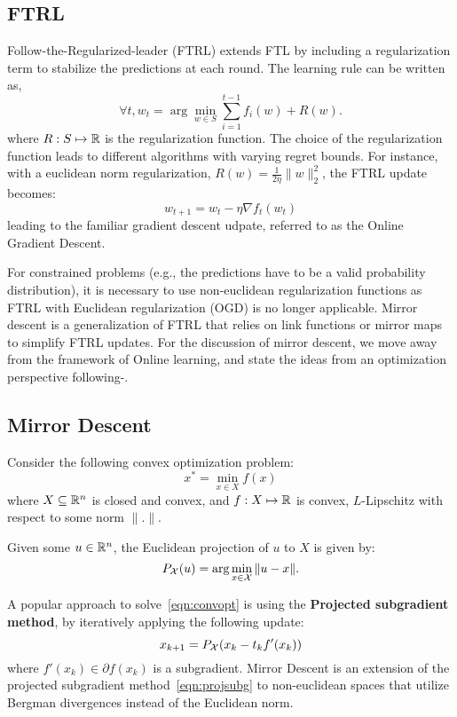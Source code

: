 \subsection{FTRL}\label{sec:ftrl}
Follow-the-Regularized-leader (FTRL) extends FTL by including a regularization term to stabilize
the predictions at each round.
The learning rule can be written as, $$\forall t, w_t = \arg \min_{w \in S} \sum_{i=1}^{t-1} f_i(w)
	+ R(w).
$$
where $R: S \mapsto \mathbb{R}$ is the regularization function.
The choice of the regularization function leads to different algorithms with varying regret bounds.
For instance, with a euclidean norm regularization, $R(w) = \frac{1}{2 \eta} \|w\|_2^2$, the FTRL
update becomes:
\begin{equation}
	w_{t+1} = w_t - \eta \nabla f_t(w_t)
\end{equation} leading to the
familiar gradient descent udpate, referred to as the Online Gradient Descent.

For constrained problems (e.g., the predictions have to be a valid probability distribution), it is
necessary to use non-euclidean regularization functions as FTRL with Euclidean regularization (OGD)
is no longer applicable.
Mirror descent is a generalization of FTRL that relies on link functions or mirror maps to simplify
FTRL updates.
For the discussion of mirror descent, we move away from the framework of Online learning, and state
the ideas from an optimization perspective following-\cite{beckMirror2003a,beckFirstOrder2017}.

\subsection{Mirror Descent}
Consider the following convex optimization problem:
\begin{equation}
	\label{eqn:convopt} x^{\ast} =
	\min_{x \in X} f(x)
\end{equation} where $X \subseteq \mathbb{R}^n$ is closed and convex, and $f: X \mapsto
	\mathbb{R}$ is convex, $L$-Lipschitz with respect to some norm $\|.
	\|$.

Given some $u \in \mathbb{R}^n$, the Euclidean projection of $u$ to $X$ is given by:
\begin{equation}
	\label{eqn:eucproj} P_{\mathcal{X}}(u) = \arg \min_{x \in \mathcal{X}} \| u - x \|.
\end{equation}

A popular approach to solve~\ref{eqn:convopt} is using the \textbf{Projected subgradient method},
by iteratively applying the following update:
\begin{equation}
	\label{eqn:projsubg} x_{k+1} =
	P_{\mathcal{X}}(x_k - t_k f'(x_k))
\end{equation} where $f'(x_k) \in \partial f(x_k)$ is a subgradient.
Mirror Descent is an extension of the projected subgradient method~\ref{eqn:projsubg} to
non-euclidean spaces that utilize Bergman divergences instead of the Euclidean norm.

